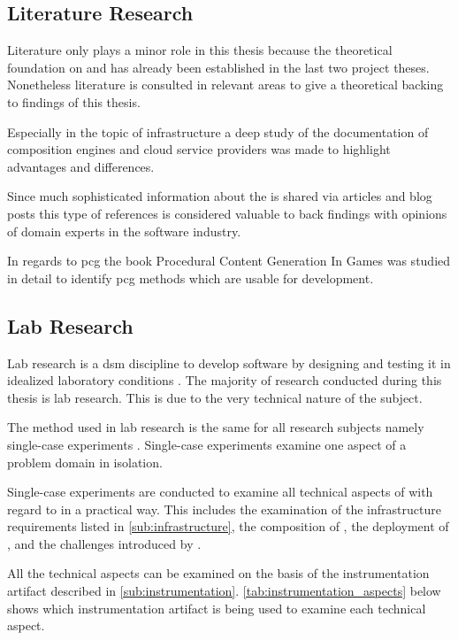 \subsection{Literature Research}

Literature only plays a minor role in this thesis because the theoretical
foundation on \mss{} and \ogs{} has already been established in the last two
project theses. Nonetheless literature is consulted in relevant areas to give
a theoretical backing to findings of this thesis.

Especially in the topic of \ms{} infrastructure a deep study of the
documentation of composition engines and cloud service providers was made
to highlight advantages and differences.

Since much sophisticated information about the \mss{} is shared via articles
and blog posts this type of references is considered valuable to back findings
with opinions of domain experts in the software industry.

In regards to \gls{pcg} the book Procedural Content Generation In
Games \cite{shaker2014procedural} was studied in detail to identify \gls{pcg}
methods which are usable for \og{} development.

\subsection{Lab Research}
\label{sub:lab_reserach}

Lab research is a \gls{dsm} discipline to develop software by designing and
testing it in idealized laboratory conditions \cite{wieringa2014design_science}.
The majority of research conducted during this thesis is lab research. This is
due to the very technical nature of the subject.

The method used in lab research is the same for all research subjects namely
single-case experiments \cite{wieringa2014design_science}. Single-case
experiments examine one aspect of a problem domain in isolation.

Single-case experiments are conducted to examine all technical aspects of \mss{}
with regard to \ogs{} in a practical way. This includes the examination of the
\ms{} infrastructure requirements listed in \autoref{sub:infrastructure}, the
composition of \mss{}, the deployment of \mss{}, and the challenges introduced
by \mss{}.

All the technical aspects can be examined on the basis of the instrumentation
artifact described in \autoref{sub:instrumentation}.
\autoref{tab:instrumentation_aspects} below shows which instrumentation artifact
is being used to examine each technical aspect.

